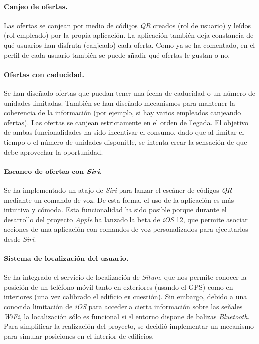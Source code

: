 \paragraph{Canjeo de ofertas.} Las ofertas se canjean por medio de códigos \emph{QR} creados (rol de usuario) y leídos (rol empleado) por la propia aplicación. La aplicación también deja constancia de qué usuarios han disfruta (canjeado) cada oferta.
Como ya se ha comentado, en el perfil de cada usuario también se puede añadir qué ofertas le gustan o no.

\paragraph{Ofertas con caducidad.} Se han diseñado ofertas que puedan tener una fecha de caducidad o un número de unidades limitadas. 
También se han diseñado mecanismos para mantener la coherencia de la información (por ejemplo, si hay varios empleados canjeando ofertas). Las ofertas se canjean estrictamente en el orden de llegada.
El objetivo de ambas funcionalidades ha sido incentivar el consumo, dado que al limitar el tiempo o el número de unidades disponible, se intenta crear la sensación de que debe aprovechar la oportunidad.

\paragraph{Escaneo de ofertas con \textit{Siri}.} 
Se ha implementado un atajo de \emph{Siri} para lanzar el escáner de códigos \emph{QR} mediante un comando de voz.
De esta forma, el uso de la aplicación es más intuitiva y cómoda.
Esta funcionalidad ha sido posible porque durante el desarrollo del proyecto \textit{Apple} ha lanzado la beta de \textit{iOS} 12, que permite asociar acciones de una aplicación con comandos de voz personalizados para ejecutarlos desde \textit{Siri}. 

\paragraph{Sistema de localización del usuario.} Se ha integrado el servicio de localización de \textit{Situm}, que nos permite conocer la posición de un teléfono móvil tanto en exteriores (usando el GPS) como en interiores (una vez calibrado el edificio en cuestión).
Sin embargo, debido a una conocida limitación de \textit{iOS} para acceder a cierta información sobre las señales \textit{WiFi}, la localización sólo es funcional si el entorno dispone de balizas \emph{Bluetooth}.
Para simplificar la realización del proyecto, se decidió implementar un mecanismo para simular posiciones en el interior de edificios. 

